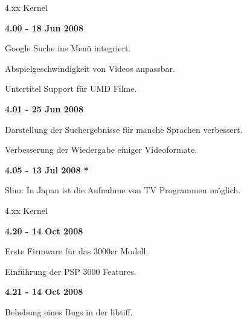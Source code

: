 \documentclass[mode=print,paper=screen,size=10pt,style=paintings]{powerdot}
\begin{document}
\begin{slide}{4.xx Kernel}
	\begin{large}\textbf{4.00 - 18 Jun 2008}\end{large}
	\begin{list}{-}{}
		\item{Google Suche ins Menü integriert.}
		\item{Abspielgeschwindigkeit von Videos anpassbar.}
		\item{Untertitel Support für UMD Filme.}
	\end{list}
	\begin{large}\textbf{4.01 - 25 Jun 2008}\end{large}
	\begin{list}{-}{}
		\item{Darstellung der Suchergebnisse für manche Sprachen verbessert.}
		\item{Verbesserung der Wiedergabe einiger Videoformate.}
	\end{list}
	\begin{large}\textbf{4.05 - 13 Jul 2008 *}\end{large}
	\begin{list}{-}{}
		\item{Slim: In Japan ist die Aufnahme von TV Programmen möglich.}
	\end{list}
\end{slide}

\begin{slide}{4.xx Kernel}
	\begin{large}\textbf{4.20 - 14 Oct 2008}\end{large}
	\begin{list}{-}{}
		\item{Erste Firmware für das 3000er Modell.}
		\item{Einführung der PSP 3000 Features.}
	\end{list}
	\begin{large}\textbf{4.21 - 14 Oct 2008}\end{large}
	\begin{list}{-}{}
		\item{Behebung eines Bugs in der libtiff.}
	\end{list}
\end{slide}
\end{document}
